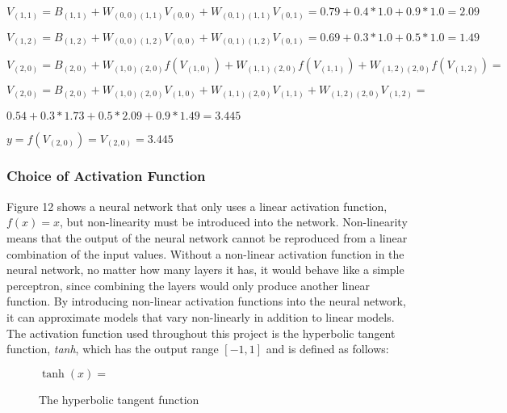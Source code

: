 \documentclass[titlepage]{article}
\begin{document}
\vskip 0.2cm

\centerline{$V_{(1, 1)} = B_{(1, 1)} + W_{(0, 0) (1, 1)} V_{(0, 0)} + W_{(0, 1) (1, 1)} V_{(0, 1)} = 0.79 + 0.4 * 1.0 + 0.9 * 1.0 = 2.09$}

\vskip 0.2cm

\centerline{$V_{(1, 2)} = B_{(1, 2)} + W_{(0, 0) (1, 2)} V_{(0, 0)} + W_{(0, 1) (1, 2)} V_{(0, 1)} = 0.69 + 0.3 * 1.0 + 0.5 * 1.0 = 1.49$}

\vskip 0.5cm

\centerline{$V_{(2, 0)} = B_{(2, 0)} + W_{(1, 0) (2, 0)} f(V_{(1, 0)}) + W_{(1, 1) (2, 0)} f(V_{(1, 1)}) + W_{(1, 2) (2, 0)} f(V_{(1, 2)}) =$}

\vskip 0.2cm

\centerline{$V_{(2, 0)} = B_{(2, 0)} + W_{(1, 0) (2, 0)} V_{(1, 0)} + W_{(1, 1) (2, 0)} V_{(1, 1)} + W_{(1, 2) (2, 0)} V_{(1, 2)} =$}

\vskip 0.2cm

\centerline{$0.54 + 0.3 * 1.73 + 0.5 * 2.09 + 0.9 * 1.49 = 3.445$}

\vskip 0.5cm

\centerline{$y = f(V_{(2, 0)}) = V_{(2, 0)} = 3.445$}

\vskip 1cm

\subsubsection{Choice of Activation Function}

\vskip 0.2cm

Figure 12 shows a neural network that only uses a linear activation function, $f(x) = x$, but non-linearity must be introduced into the network. Non-linearity means that the output of the neural network cannot be reproduced from a linear combination of the input values. Without a non-linear activation function in the neural network, no matter how many layers it has, it would behave like a simple perceptron, since combining the layers would only produce another linear function. By introducing non-linear activation functions into the neural network, it can approximate models that vary non-linearly in addition to linear models. The activation function used throughout this project is the hyperbolic tangent function, \emph{tanh}, which has the output range $[-1, 1]$ and is defined as follows:

\vskip 0.4cm

\begin{figure}[h]
    \centerline{$\tanh(x) =$ }
    \vskip 0.2cm
    \caption{The hyperbolic tangent function}
\end{figure}
\end{document}
